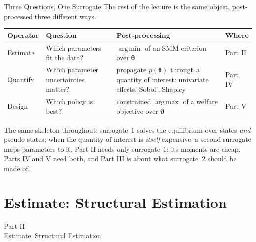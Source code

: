 \documentclass[aspectratio=169,11pt]{beamer}
\newcommand{\emphc}[1]{\textcolor{harvardcrimson}{#1}}
\newcommand{\str}{\bm{\theta}}          %
\newcommand{\pol}{\bm{\vartheta}}       %
\DeclareMathOperator*{\argmin}{arg\,min}
\DeclareMathOperator*{\argmax}{arg\,max}
\begin{document}
\begin{frame}{Three Questions, One Surrogate}
\small
The rest of the lecture is the same object, post-processed three different ways.

\vspace{0.4em}
\begin{center}
\footnotesize
\begin{tabular}{>{\raggedright\arraybackslash}p{}>{\raggedright\arraybackslash}p{}>{\raggedright\arraybackslash}p{}>{\raggedright\arraybackslash}p{}}
\toprule
\textbf{Operator} & \textbf{Question} & \textbf{Post-processing} & \textbf{Where} \\
\midrule
\emphc{Estimate} & Which parameters fit the data? & $\argmin$ of an SMM criterion over $\str$ & Part II \\[3pt]
\emphc{Quantify} & Which parameter uncertainties matter? & propagate $p(\str)$ through a quantity of interest: univariate effects, Sobol', Shapley & Part IV \\[3pt]
\emphc{Design} & Which policy is best? & constrained $\argmax$ of a welfare objective over $\pol$ & Part V \\
\bottomrule
\end{tabular}
\end{center}

\vspace{0.4em}
The same skeleton throughout: surrogate~1 solves the equilibrium over states \emph{and} pseudo-states; when the quantity of interest is \emph{itself} expensive, a second surrogate maps parameters to it. \emphc{Part II needs only surrogate~1}: its moments are cheap. Parts IV and V need both, and Part III is about what surrogate~2 should be made of.
\end{frame}


\section{Estimate: Structural Estimation}

\begin{frame}{}
\begin{center}
{\Huge \textcolor{uzhblue}{Part II}}\\[0.8em]
{\LARGE Estimate: Structural Estimation}
\end{center}
\end{frame}
\end{document}
